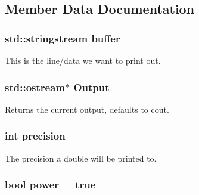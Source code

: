\subsection{Member Data Documentation}
\hypertarget{classJKBuilder_1_1IOManager_adbf6a7492c6521b38c1510aebe307770}{
\subsubsection[{buffer}]{\setlength{\rightskip}{0pt plus 5cm}std::stringstream {\bf buffer}}}
\label{classJKBuilder_1_1IOManager_adbf6a7492c6521b38c1510aebe307770}


This is the line/data we want to print out. \hypertarget{classJKBuilder_1_1IOManager_aafe3b1218427d92a689d147f74e74f4b}{
\subsubsection[{Output}]{\setlength{\rightskip}{0pt plus 5cm}std::ostream$\ast$ {\bf Output}}}
\label{classJKBuilder_1_1IOManager_aafe3b1218427d92a689d147f74e74f4b}


Returns the current output, defaults to cout. \hypertarget{classJKBuilder_1_1IOManager_aa95455ed52a8459fad69509a4a0411b5}{
\subsubsection[{precision}]{\setlength{\rightskip}{0pt plus 5cm}int {\bf precision}}}
\label{classJKBuilder_1_1IOManager_aa95455ed52a8459fad69509a4a0411b5}


The precision a double will be printed to. \hypertarget{classJKBuilder_1_1IOManager_aababa9aef0d20ddcfce2d78f41ae1dd8}{
\subsubsection[{power}]{\setlength{\rightskip}{0pt plus 5cm}bool {\bf power} = true}}
\label{classJKBuilder_1_1IOManager_aababa9aef0d20ddcfce2d78f41ae1dd8}



